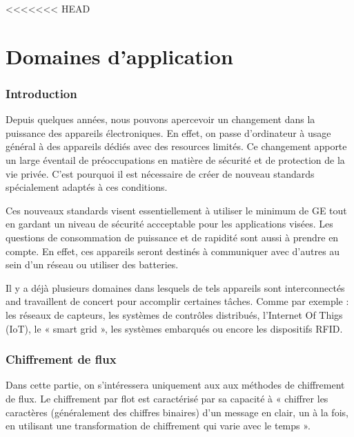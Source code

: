 <<<<<<< HEAD
			\vspace{0.5cm}

			\part{Domaines d'application}

			\section{Introduction}


			Depuis quelques années, nous pouvons apercevoir un changement dans la puissance des appareils électroniques.
			En effet, on passe d'ordinateur à usage général à des appareils dédiés avec des resources limités.
			Ce changement apporte un large éventail de préoccupations en matière de sécurité et de protection de la vie privée.
			C'est pourquoi il est nécessaire de créer de nouveau standards spécialement adaptés à ces conditions.
			
			Ces nouveaux standards visent essentiellement à utiliser le minimum de GE tout en gardant un niveau de sécurité accceptable pour les applications visées.
			Les questions de consommation de puissance et de rapidité sont aussi à prendre en compte.
			En effet, ces appareils seront destinés à communiquer avec d'autres au sein d'un réseau ou utiliser des batteries.
			
			Il y a déjà plusieurs domaines dans lesquels de tels appareils sont interconnectés and travaillent de concert pour accomplir certaines tâches.
			Comme par exemple : les réseaux de capteurs, les systèmes de contrôles distribués, l'Internet Of Thigs (IoT), le « smart grid », les systèmes embarqués ou encore les dispositifs RFID.
			
			\section{Chiffrement de flux}
			
			Dans cette partie, on s'intéressera uniquement aux aux méthodes de chiffrement de flux.
			Le chiffrement par flot est caractérisé par sa capacité à « chiffrer les caractères (généralement des chiffres binaires) d'un message en clair, un à la fois,
			en utilisant une transformation de chiffrement qui varie avec le temps »\cite{appliedCrypto}.
			
